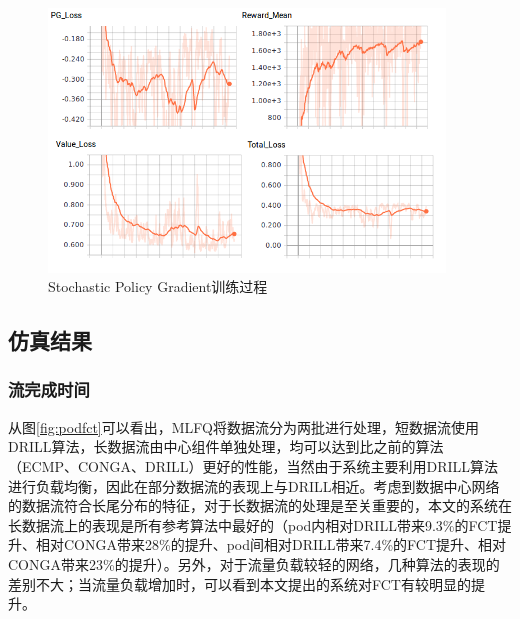 \begin{figure}[ht]
\centering
\includegraphics[height=7cm]{figure/tensorboard_PG.png}
\caption{Stochastic Policy Gradient训练过程}
\label{fig:cognitive}
\end{figure}


\subsection{仿真结果}
\subsubsection{流完成时间}
从图\ref{fig:podfct}可以看出，MLFQ将数据流分为两批进行处理，短数据流使用DRILL算法，长数据流由中心组件单独处理，均可以达到比之前的算法（ECMP、CONGA、DRILL）更好的性能，当然由于系统主要利用DRILL算法进行负载均衡，因此在部分数据流的表现上与DRILL相近。考虑到数据中心网络的数据流符合长尾分布的特征，对于长数据流的处理是至关重要的，本文的系统在长数据流上的表现是所有参考算法中最好的（pod内相对DRILL带来9.3\%的FCT提升、相对CONGA带来28\%的提升、pod间相对DRILL带来7.4\%的FCT提升、相对CONGA带来23\%的提升）。另外，对于流量负载较轻的网络，几种算法的表现的差别不大；当流量负载增加时，可以看到本文提出的系统对FCT有较明显的提升。

